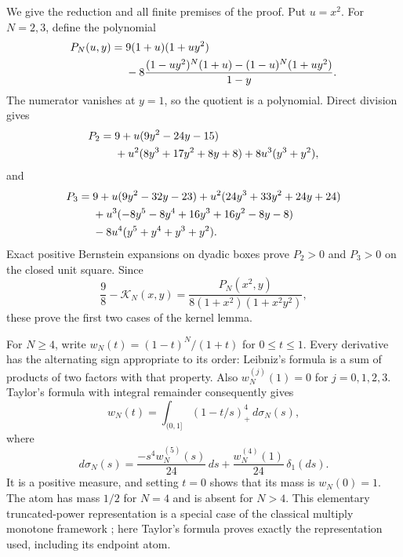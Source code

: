 We give the reduction and all finite premises of the proof. Put $u=x^2$.
For $N=2,3$, define the polynomial
\begin{align}\label{eul:eq:PN}
 P_N(u,y)={}&9(1+u)(1+uy^2)\\
 &-8\frac{(1-uy^2)^N(1+u)-(1-u)^N(1+uy^2)}{1-y}.\notag
\end{align}
The numerator vanishes at $y=1$, so the quotient is a polynomial.
Direct division gives
\begin{align}\label{eul:eq:P2}
 P_2={}&9+u(9y^2-24y-15)\notag\\
 &+u^2(8y^3+17y^2+8y+8)+8u^3(y^3+y^2),
\end{align}
and
\begin{align}\label{eul:eq:P3}
 P_3={}&9+u(9y^2-32y-23)
       +u^2(24y^3+33y^2+24y+24)\notag\\
 &+u^3(-8y^5-8y^4+16y^3+16y^2-8y-8)\notag\\
 &-8u^4(y^5+y^4+y^3+y^2).
\end{align}
Exact positive Bernstein expansions on dyadic boxes prove
$P_2>0$ and $P_3>0$ on the closed unit square. Since
\[
 \frac98-\mathcal K_N(x,y)
 =\frac{P_N(x^2,y)}{8(1+x^2)(1+x^2y^2)},
\]
these prove the first two cases of the kernel lemma.

For $N\ge4$, write
$w_N(t)=(1-t)^N/(1+t)$ for $0\le t\le1$. Every derivative has the
alternating sign appropriate to its order: Leibniz's formula is a
sum of products of two factors with that property. Also
$w_N^{(j)}(1)=0$ for $j=0,1,2,3$. Taylor's formula with integral
remainder consequently gives
\begin{equation}\label{eul:eq:mixture}
 w_N(t)=\int_{(0,1]}(1-t/s)_+^4\,d\sigma_N(s),
\end{equation}
where
\begin{equation}\label{eul:eq:mixture-measure}
 d\sigma_N(s)=\frac{-s^4w_N^{(5)}(s)}{24}\,ds
             +\frac{w_N^{(4)}(1)}{24}\,\delta_1(ds).
\end{equation}
It is a positive measure, and setting $t=0$ shows that its mass is
$w_N(0)=1$. The atom has mass $1/2$ for $N=4$ and is absent for
$N>4$. This elementary truncated-power representation is a special
case of the classical multiply monotone framework
\cite{Williamson,McNeilNeslehova}; here Taylor's formula proves exactly
the representation used, including its endpoint atom.

